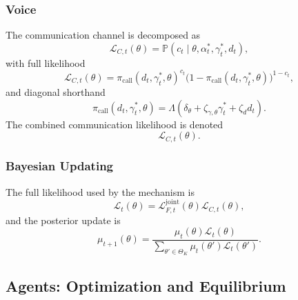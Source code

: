 \documentclass[12pt,a4paper]{article}
\theoremstyle{plain}
\theoremstyle{definition}
\theoremstyle{remark}
\newcommand{\ProbE}{\mathbb{P}}
\newcommand{\1}{\mathbf{1}}
\begin{document}
\subsubsection{Voice}
\label{subsec:voz}

The communication channel is decomposed as
\begin{equation}
\label{eq:voz-descomp}
\mathcal L_{C,t}(\theta)=\ProbE(c_t\mid\theta,\alpha_t^\ast,\gamma_t^\ast,d_t),
\end{equation}
with full likelihood
\begin{equation}
\label{eq:Lvoz-full}
\mathcal L_{C,t}(\theta)
=\pi_{\mathrm{call}}(d_t,\gamma_t^\ast,\theta)^{c_t}
\bigl(1-\pi_{\mathrm{call}}(d_t,\gamma_t^\ast,\theta)\bigr)^{1-c_t},
\end{equation}
and diagonal shorthand
\begin{equation}
\label{eq:Lvoz-diag}
\pi_{\mathrm{call}}(d_t,\gamma_t^\ast,\theta)
=\Lambda(\delta_\theta+\zeta_{\gamma,\theta}\gamma_t^\ast+\zeta_d d_t).
\end{equation}
The combined communication likelihood is denoted
\begin{equation}
\label{eq:LC}
\mathcal L_{C,t}(\theta).
\end{equation}

\subsubsection{Bayesian Updating}
\label{sec:bayesian-updating}

The full likelihood used by the mechanism is
\begin{equation}
\label{eq:LF-joint-opt}
\mathcal L_t(\theta)
=\mathcal L_{F,t}^{\mathrm{joint}}(\theta)\mathcal L_{C,t}(\theta),
\end{equation}
and the posterior update is
\begin{equation}
\label{eq:bayes-unif}
\mu_{t+1}(\theta)
=
\frac{\mu_t(\theta)\mathcal L_t(\theta)}
{\sum_{\theta'\in\Theta_K}\mu_t(\theta')\mathcal L_t(\theta')}.
\end{equation}

\subsection{Agents: Optimization and Equilibrium}
\label{sec:actions}
\label{sec:mapa-acciones}
\end{document}
